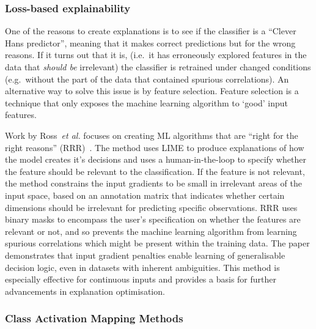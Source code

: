 \subsubsection{Loss-based explainability}

One of the reasons to create explanations is to see if the classifier is a ``Clever Hans predictor'', meaning that it makes correct predictions but for the wrong reasons. If it turns out that it is, (i.e.\ it has erroneously explored features in the data that \textit{should be} irrelevant) the classifier is retrained under changed conditions (e.g.\ without the part of the data that contained spurious correlations). An alternative way to solve this issue is by feature selection. Feature selection is a technique that only exposes the machine learning algorithm to ‘good’ input features.

Work by Ross~\textit{et al.} focuses on creating ML algorithms that are “right for the right reasons” (RRR)~\cite{RossHD17}. The method uses LIME to produce explanations of how the model creates it's decisions and uses a human-in-the-loop to specify whether the feature should be relevant to the classification. If the feature is not relevant, the method constrains the input gradients to be small in irrelevant areas of the input space, based on an annotation matrix that indicates whether certain dimensions should be irrelevant for predicting specific observations. RRR uses binary masks to encompass the user's specification on whether the features are relevant or not, and so prevents the machine learning algorithm from learning spurious correlations which might be present within the training data. The paper demonstrates that input gradient penalties enable learning of generalisable decision logic, even in datasets with inherent ambiguities. This method is especially effective for continuous inputs and provides a basis for further advancements in explanation optimisation.



\subsubsection{Class Activation Mapping Methods}

